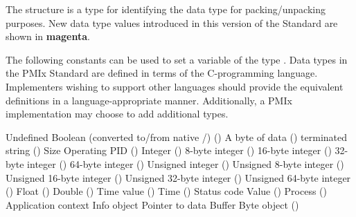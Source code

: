 The  structure is a  type for identifying the data type for packing/unpacking purposes. New data type values introduced in this version of the Standard are shown in \textbf{\color{magenta}magenta}.

\adviceimplstart
The following constants can be used to set a variable of the type . Data types in the \ac{PMIx} Standard are defined in terms of the C-programming language. Implementers wishing to support other languages should provide the equivalent definitions in a language-appropriate manner. Additionally, a PMIx implementation may choose to add additional types.
\adviceimplend

\begin{constantdesc}
%
Undefined
%
Boolean (converted to/from native /) ()
%
A byte of data ()
%
 terminated string ()
%
Size 
%
Operating \ac{PID} ()
%
Integer ()
%
8-byte integer ()
%
16-byte integer ()
%
32-byte integer ()
%
64-byte integer ()
%
Unsigned integer ()
%
Unsigned 8-byte integer ()
%
Unsigned 16-byte integer ()
%
Unsigned 32-byte integer ()
%
Unsigned 64-byte integer ()
%
Float ()
%
Double ()
%
Time value ()
%
Time ()
%
Status code {}
%
Value ()
%
Process ()
%
Application context
%
Info object
%
Pointer to data
%
Buffer
%
Byte object ()
%

\end{constantdesc}
